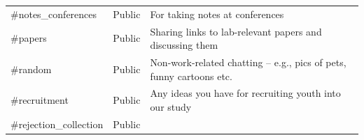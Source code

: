 \documentclass[]{book}
\begin{document}
\begin{longtable}[]{@{}lll@{}}
\begin{minipage}[t]{0.18\columnwidth}\raggedright
\#notes\_conferences\strut
\end{minipage} & \begin{minipage}[t]{0.04\columnwidth}\raggedright
Public\strut
\end{minipage} & \begin{minipage}[t]{0.70\columnwidth}\raggedright
For taking notes at conferences\strut
\end{minipage}\tabularnewline
\begin{minipage}[t]{0.18\columnwidth}\raggedright
\#papers\strut
\end{minipage} & \begin{minipage}[t]{0.04\columnwidth}\raggedright
Public\strut
\end{minipage} & \begin{minipage}[t]{0.70\columnwidth}\raggedright
Sharing links to lab-relevant papers and discussing them\strut
\end{minipage}\tabularnewline
\begin{minipage}[t]{0.18\columnwidth}\raggedright
\#random\strut
\end{minipage} & \begin{minipage}[t]{0.04\columnwidth}\raggedright
Public\strut
\end{minipage} & \begin{minipage}[t]{0.70\columnwidth}\raggedright
Non-work-related chatting -- e.g., pics of pets, funny cartoons etc.\strut
\end{minipage}\tabularnewline
\begin{minipage}[t]{0.18\columnwidth}\raggedright
\#recruitment\strut
\end{minipage} & \begin{minipage}[t]{0.04\columnwidth}\raggedright
Public\strut
\end{minipage} & \begin{minipage}[t]{0.70\columnwidth}\raggedright
Any ideas you have for recruiting youth into our study\strut
\end{minipage}\tabularnewline
\begin{minipage}[t]{0.18\columnwidth}\raggedright
\#rejection\_collection\strut
\end{minipage} & \begin{minipage}[t]{0.04\columnwidth}\raggedright
Public\strut
\end{minipage} & \begin{minipage}[t]{0.70\columnwidth}\raggedright

\end{minipage}
\end{longtable}
\end{document}
